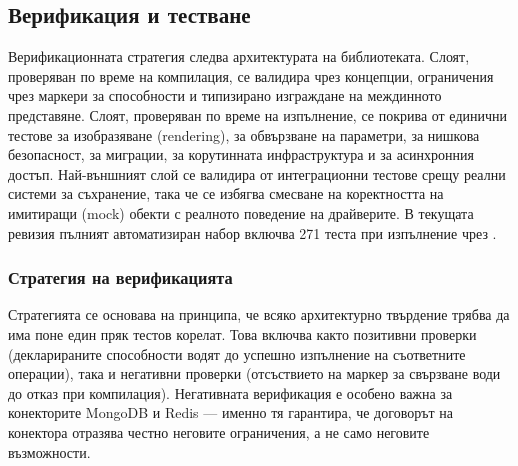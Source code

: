 \subsection{Верификация и тестване}
\label{subsec:verification}

Верификационната стратегия следва архитектурата на библиотеката. Слоят, проверяван по време на компилация, се валидира чрез концепции, ограничения чрез маркери за способности и типизирано изграждане на междинното представяне. Слоят, проверяван по време на изпълнение, се покрива от единични тестове за изобразяване (rendering), за обвързване на параметри, за нишкова безопасност, за миграции, за корутинната инфраструктура и за асинхронния достъп. Най-външният слой се валидира от интеграционни тестове срещу реални системи за съхранение, така че се избягва смесване на коректността на имитиращи (mock) обекти с реалното поведение на драйверите. В текущата ревизия пълният автоматизиран набор включва 271 теста при изпълнение чрез .

\subsubsection{Стратегия на верификацията}

Стратегията се основава на принципа, че всяко архитектурно твърдение трябва да има поне един пряк тестов корелат. Това включва както позитивни проверки (декларираните способности водят до успешно изпълнение на съответните операции), така и негативни проверки (отсъствието на маркер за свързване води до отказ при компилация). Негативната верификация е особено важна за конекторите MongoDB и Redis --- именно тя гарантира, че договорът на конектора отразява честно неговите ограничения, а не само неговите възможности.

